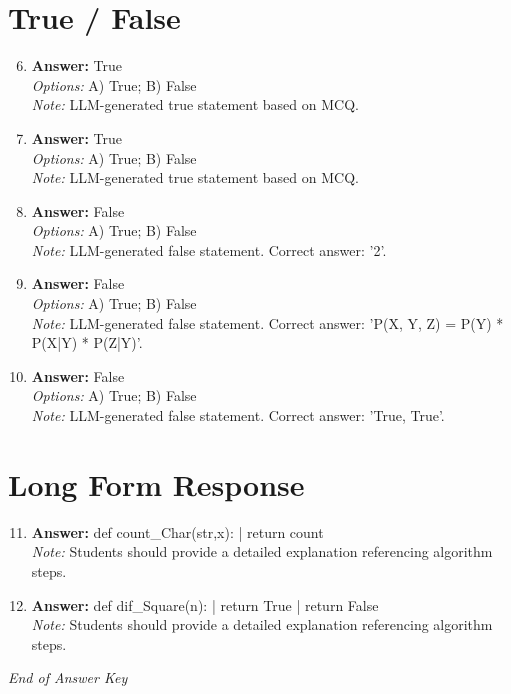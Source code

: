 \documentclass[12pt]{article}
\begin{document}
\section*{True / False}
\begin{enumerate}[label=\arabic*.]
\setcounter{enumi}{5}
\item \textbf{Answer:} True
\\ \textit{Options:} A) True; B) False
\\ \textit{Note:} LLM-generated true statement based on MCQ.
\item \textbf{Answer:} True
\\ \textit{Options:} A) True; B) False
\\ \textit{Note:} LLM-generated true statement based on MCQ.
\item \textbf{Answer:} False
\\ \textit{Options:} A) True; B) False
\\ \textit{Note:} LLM-generated false statement. Correct answer: '2'.
\item \textbf{Answer:} False
\\ \textit{Options:} A) True; B) False
\\ \textit{Note:} LLM-generated false statement. Correct answer: 'P(X, Y, Z) = P(Y) * P(X|Y) * P(Z|Y)'.
\item \textbf{Answer:} False
\\ \textit{Options:} A) True; B) False
\\ \textit{Note:} LLM-generated false statement. Correct answer: 'True, True'.
\end{enumerate}

\section*{Long Form Response}
\begin{enumerate}[label=\arabic*.]
\setcounter{enumi}{10}
\item \textbf{Answer:} def count\_Char(str,x): | return count
\\ \textit{Note:} Students should provide a detailed explanation referencing algorithm steps.
\item \textbf{Answer:} def dif\_Square(n): | return True | return False
\\ \textit{Note:} Students should provide a detailed explanation referencing algorithm steps.
\end{enumerate}

\vfill
\noindent\textit{End of Answer Key}
\end{document}
